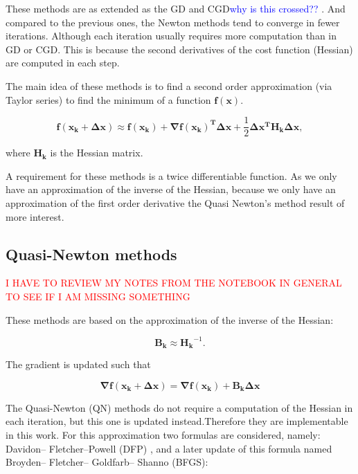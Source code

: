 These methods are as extended as the GD and CGD\textcolor{blue}{why is this crossed?? }. And compared to the previous ones, the Newton methods tend to converge in fewer iterations. Although each iteration usually requires more computation than  in GD or CGD. This is because the second derivatives of the cost function (Hessian) are computed in each step. 

The main idea of these methods is to find a second order approximation (via Taylor series) to find the minimum of a function $\mathbf{f(x)}$.


\begin{equation}
\mathbf{f(x_k + \Delta x) }\approx \mathbf{f(x_k) } + \mathbf{\nabla f(x_k)^{T} }\mathbf{\Delta x} + \frac{1}{2} \mathbf{\Delta x^{T} }\mathbf{H_k} \mathbf{\Delta x},
\end{equation}

where $\mathbf{H_k}$ is the Hessian matrix.
 
A requirement for these methods is a twice differentiable function. 
As we only have an approximation of the inverse of the Hessian, because we only have an approximation of the first order derivative the Quasi Newton's method result of more interest.


\subsection{Quasi-Newton methods}
\label{subsec:quasinewton}

\textcolor{red}{I HAVE TO REVIEW MY NOTES FROM THE NOTEBOOK IN GENERAL TO SEE IF I AM MISSING SOMETHING	}
 
These methods are based on the approximation of the inverse of the Hessian:

\begin{equation}
\mathbf{B_k} \approx \mathbf{H_k}^{-1}. 
\end{equation}

The gradient is updated such that

\begin{equation}
\mathbf{\nabla f(x_k + \Delta x)} = \mathbf{\nabla f(x_k) + \mathbf{B_k}\mathbf{ \Delta x }} 
\end{equation}



The Quasi-Newton (QN) methods do not require a computation of the Hessian in each iteration, but this one is updated instead.Therefore they are implementable in this work.
For this approximation two formulas are considered, namely: Davidon–
Fletcher–Powell (DFP) \cite{DFP}, and a later update of this formula named Broyden– Fletcher– Goldfarb– Shanno (BFGS)\cite{BFGS}:


